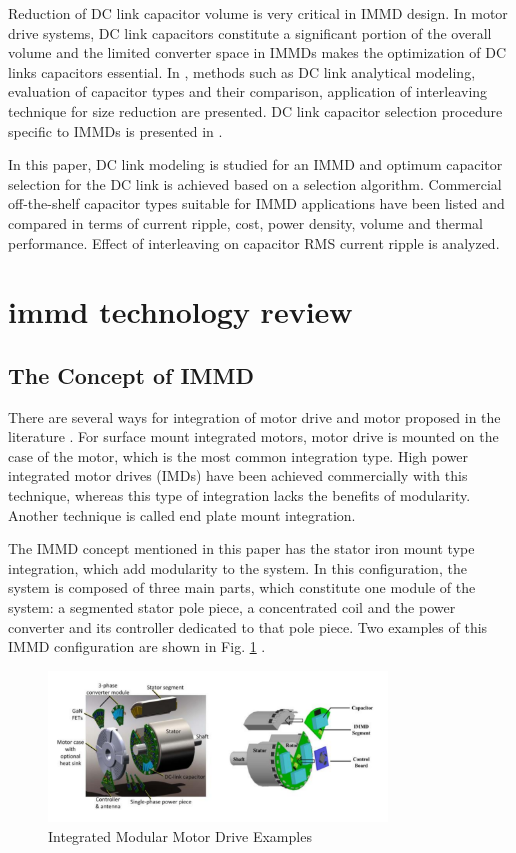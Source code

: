 \documentclass[conference,a4paper,twocolumn]{IEEEtran}
\begin{document}
Reduction of DC link capacitor volume is very critical in IMMD design. In motor drive systems, DC link capacitors constitute a significant portion of the overall volume and the limited converter space in IMMDs makes the optimization of DC links capacitors essential. In \cite{Su2010,Bianchi2003,Zhang2010}, methods such as DC link analytical modeling, evaluation of capacitor types and their comparison, application of interleaving technique for size reduction are presented. DC link capacitor selection procedure specific to IMMDs is presented in \cite{LoCalzo2016,Wang2014,Wang2015b}.

In this paper, DC link modeling is studied for an IMMD and optimum capacitor selection for the DC link is achieved based on a selection algorithm. Commercial off-the-shelf capacitor types suitable for IMMD applications have been listed and compared in terms of current ripple, cost, power density, volume and thermal performance. Effect of interleaving on capacitor RMS current ripple is analyzed.



\section{immd technology review}

\subsection{The Concept of IMMD}

There are several ways for integration of motor drive and motor proposed in the literature \cite{LoCalzo2016,Wolmarans2008}. For surface mount integrated motors, motor drive is mounted on the case of the motor, which is the most common integration type. High power integrated motor drives (IMDs) have been achieved commercially with this technique, whereas this type of integration lacks the benefits of modularity. Another technique is called end plate mount integration.

The IMMD concept mentioned in this paper has the stator iron mount type integration, which add modularity to the system. In this configuration, the system is composed of three main parts, which constitute one module of the system: a segmented stator pole piece, a concentrated coil and the power converter and its controller dedicated to that pole piece. Two examples of this IMMD configuration are shown in Fig. \ref{fig1} \cite{LoCalzo2016,Wang2015b}.


\begin{figure}[h]
  \centering
  \includegraphics[width=9cm]{fig1}
  \caption{Integrated Modular Motor Drive Examples \cite{LoCalzo2016,Wang2015b}}
  \label{fig1}
\end{figure}
\end{document}
